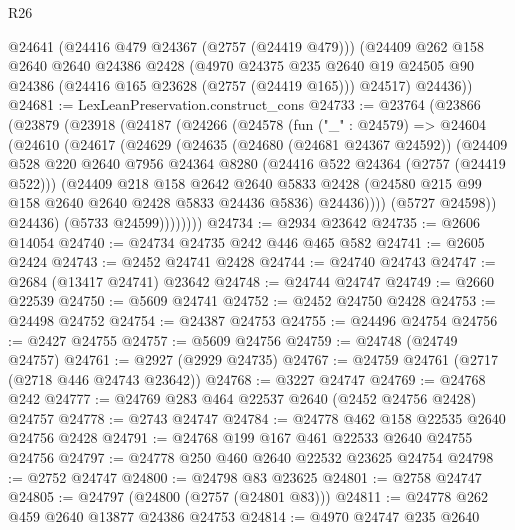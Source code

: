 \begin{lexlean}{R26}
\begin{coremodule}
      @24641
      (@24416 @479 @24367 (@2757 (@24419 @479)))
      (@24409
        @262
        @158
        @2640
        @2640
        @24386
        @2428
        (@4970
          @24375
          @235
          @2640
          @19
          @24505
          @90
          @24386
          (@24416 @165 @23628 (@2757 (@24419 @165)))
          @24517)
        @24436))
@24681 := LexLeanPreservation.construct_cons
@24733 := @23764
    (@23866
      (@23879
        (@23918
          (@24187
            (@24266
              (@24578
                (fun ("_" : @24579) =>
                @24604
                  (@24610
                    (@24617
                      (@24629
                        (@24635
                          (@24680 (@24681 @24367 @24592))
                          (@24409
                            @528
                            @220
                            @2640
                            @7956
                            @24364
                            @8280
                            (@24416 @522 @24364 (@2757 (@24419 @522)))
                            (@24409
                              @218
                              @158
                              @2642
                              @2640
                              @5833
                              @2428
                              (@24580 @215 @99 @158 @2640 @2640 @2428 @5833 @24436 @5836)
                              @24436))))
                      (@5727 @24598))
                    @24436)
                  (@5733 @24599))))))))
@24734 := @2934 @23642
@24735 := @2606 @14054
@24740 := @24734 @24735 @242 @446 @465 @582
@24741 := @2605 @2424
@24743 := @2452 @24741 @2428
@24744 := @24740 @24743
@24747 := @2684 (@13417 @24741) @23642
@24748 := @24744 @24747
@24749 := @2660 @22539
@24750 := @5609 @24741
@24752 := @2452 @24750 @2428
@24753 := @24498 @24752
@24754 := @24387 @24753
@24755 := @24496 @24754
@24756 := @2427 @24755
@24757 := @5609 @24756
@24759 := @24748 (@24749 @24757)
@24761 := @2927 (@2929 @24735)
@24767 := @24759 @24761 (@2717 (@2718 @446 @24743 @23642))
@24768 := @3227 @24747
@24769 := @24768 @242
@24777 := @24769 @283 @464 @22537 @2640 (@2452 @24756 @2428) @24757
@24778 := @2743 @24747
@24784 := @24778 @462 @158 @22535 @2640 @24756 @2428
@24791 := @24768 @199 @167 @461 @22533 @2640 @24755 @24756
@24797 := @24778 @250 @460 @2640 @22532 @23625 @24754
@24798 := @2752 @24747
@24800 := @24798 @83 @23625
@24801 := @2758 @24747
@24805 := @24797 (@24800 (@2757 (@24801 @83)))
@24811 := @24778 @262 @459 @2640 @13877 @24386 @24753
@24814 := @4970 @24747 @235 @2640

\end{coremodule}
\end{lexlean}
